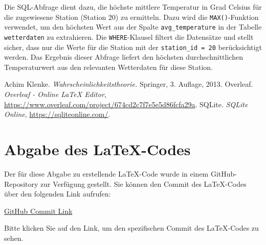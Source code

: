 \documentclass[a4paper,12pt]{article}
\begin{document}
Die SQL-Abfrage dient dazu, die höchste mittlere Temperatur in Grad Celsius für die zugewiesene Station (Station 20) zu ermitteln. Dazu wird die \texttt{MAX()}-Funktion verwendet, um den höchsten Wert aus der Spalte \texttt{avg\_temperature} in der Tabelle \texttt{wetterdaten} zu extrahieren. Die \texttt{WHERE}-Klausel filtert die Datensätze und stellt sicher, dass nur die Werte für die Station mit der \texttt{station\_id = 20} berücksichtigt werden. Das Ergebnis dieser Abfrage liefert den höchsten durchschnittlichen Temperaturwert aus den relevanten Wetterdaten für diese Station.




\newpage

\begin{thebibliography}{9}
Achim Klenke. \textit{Wahrscheinlichkeitstheorie.} Springer, 3. Auflage, 2013.
Overleaf. \textit{Overleaf - Online LaTeX Editor}, \url{https://www.overleaf.com/project/674cd2c7f7e5e5d86fcfa29a}.
SQLite. \textit{SQLite Online}, \url{https://sqliteonline.com/}.
\end{thebibliography}

\section*{Abgabe des LaTeX-Codes}

Der für diese Abgabe zu erstellende LaTeX-Code wurde in einem GitHub-Repository zur Verfügung gestellt. Sie können den Commit des LaTeX-Codes über den folgenden Link aufrufen:

\href{https://github.com/winwin1309/Latex-COMET-Abgabe-1--Gruppe20/commit/c46b79784c59612828f0b85de1aa45dbfaeb9dc6}
{GitHub Commit Link}

Bitte klicken Sie auf den Link, um den spezifischen Commit des LaTeX-Codes zu sehen.
\end{document}
